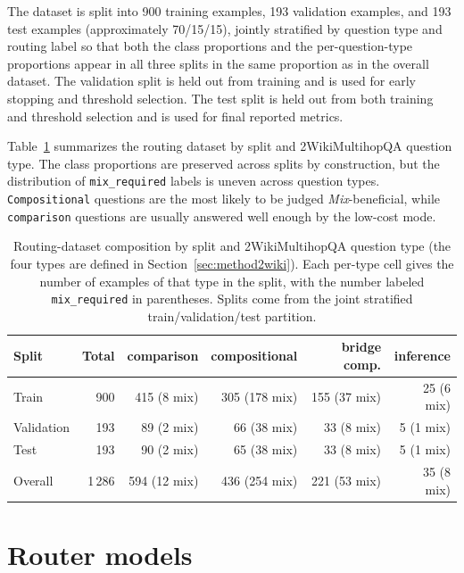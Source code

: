 \documentclass[english, bibtex]{kththesis}               %
\numberwithin{listing}{chapter}
\begin{document}
The dataset is split into 900 training examples, 193 validation examples, and 193 test examples (approximately 70/15/15), jointly stratified by question type and routing label so that both the class proportions and the per-question-type proportions appear in all three splits in the same proportion as in the overall dataset. The validation split is held out from training and is used for early stopping and threshold selection. The test split is held out from both training and threshold selection and is used for final reported metrics.

Table~\ref{tab:datasetSummary} summarizes the routing dataset by split and 2WikiMultihopQA question type. The class proportions are preserved across splits by construction, but the distribution of \texttt{mix\_required} labels is uneven across question types. \texttt{Compositional} questions are the most likely to be judged \emph{Mix}-beneficial, while \texttt{comparison} questions are usually answered well enough by the low-cost mode.

\begin{table}[!ht]
\begin{center}
\caption{Routing-dataset composition by split and 2WikiMultihopQA question type (the four types are defined in Section~\ref{sec:method2wiki}). Each per-type cell gives the number of examples of that type in the split, with the number labeled \texttt{mix\_required} in parentheses. Splits come from the joint stratified train/validation/test partition.}
\label{tab:datasetSummary}
\small
\setlength{\tabcolsep}{3pt}
\begin{tabular}{l|r|rrrr}
\textbf{Split} & \textbf{Total} & \textbf{comparison} & \textbf{compositional} & \textbf{bridge comp.} & \textbf{inference} \\
\hline
Train & 900 & 415 (8 mix) & 305 (178 mix) & 155 (37 mix) & 25 (6 mix) \\
Validation & 193 & 89 (2 mix) & 66 (38 mix) & 33 (8 mix) & 5 (1 mix) \\
Test & 193 & 90 (2 mix) & 65 (38 mix) & 33 (8 mix) & 5 (1 mix) \\
\hline
Overall & 1\,286 & 594 (12 mix) & 436 (254 mix) & 221 (53 mix) & 35 (8 mix) \\
\end{tabular}
\end{center}
\end{table}

\section{Router models}
\label{sec:methodRouters}
\end{document}
